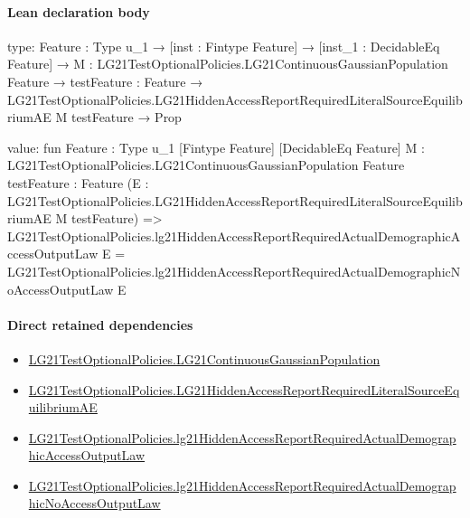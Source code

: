 \documentclass[10pt]{article}
\begin{document}
\paragraph{Lean declaration body}
\begin{ReviewVerbatim}
type:
{Feature : Type u_1} →
  [inst : Fintype Feature] →
    [inst_1 : DecidableEq Feature] →
      {M : LG21TestOptionalPolicies.LG21ContinuousGaussianPopulation Feature} →
        {testFeature : Feature} →
          LG21TestOptionalPolicies.LG21HiddenAccessReportRequiredLiteralSourceEquilibriumAE M testFeature → Prop

value:
fun {Feature : Type u_1} [Fintype Feature] [DecidableEq Feature]
    {M : LG21TestOptionalPolicies.LG21ContinuousGaussianPopulation Feature} {testFeature : Feature}
    (E : LG21TestOptionalPolicies.LG21HiddenAccessReportRequiredLiteralSourceEquilibriumAE M testFeature) =>
  LG21TestOptionalPolicies.lg21HiddenAccessReportRequiredActualDemographicAccessOutputLaw E =
    LG21TestOptionalPolicies.lg21HiddenAccessReportRequiredActualDemographicNoAccessOutputLaw E
\end{ReviewVerbatim}

\paragraph{Direct retained dependencies}
\begin{itemize}\raggedright
\item \hyperlink{paper-prerequisite-f5e1c886d250142b}{LG21\allowbreak{}Test\allowbreak{}Optional\allowbreak{}Policies.\allowbreak{}LG21\allowbreak{}Continuous\allowbreak{}Gaussian\allowbreak{}Population}
\item \hyperlink{governing-declaration-99e6af37e85fd9c2}{LG21\allowbreak{}Test\allowbreak{}Optional\allowbreak{}Policies.\allowbreak{}LG21\allowbreak{}Hidden\allowbreak{}Access\allowbreak{}Report\allowbreak{}Required\allowbreak{}Literal\allowbreak{}Source\allowbreak{}Equilibrium\allowbreak{}AE}
\item \hyperlink{governing-declaration-121dbc9acc8972d3}{LG21\allowbreak{}Test\allowbreak{}Optional\allowbreak{}Policies.\allowbreak{}lg21\allowbreak{}Hidden\allowbreak{}Access\allowbreak{}Report\allowbreak{}Required\allowbreak{}Actual\allowbreak{}Demographic\allowbreak{}Access\allowbreak{}Output\allowbreak{}Law}
\item \hyperlink{governing-declaration-e27fc9884fc621f1}{LG21\allowbreak{}Test\allowbreak{}Optional\allowbreak{}Policies.\allowbreak{}lg21\allowbreak{}Hidden\allowbreak{}Access\allowbreak{}Report\allowbreak{}Required\allowbreak{}Actual\allowbreak{}Demographic\allowbreak{}No\allowbreak{}Access\allowbreak{}Output\allowbreak{}Law}
\end{itemize}
\hypertarget{governing-declaration-a0a13845604c7cb3}{}
\end{document}
